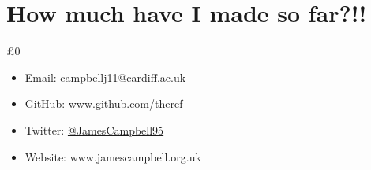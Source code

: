 \documentclass{beamer}
\begin{document}
\section{How much have I made so far?!!}

\begin{frame}{}
  \begin{center}
    {\fontsize{5cm}{5.5cm} \selectfont £0}
  \end{center}
\end{frame}

\begin{frame}[standout]
  \begin{itemize}
    \itemsep2em
    \item Email: \href{mailto:campbellj11@cardiff.ac.uk}{campbellj11@cardiff.ac.uk}

    \item GitHub: \href{https://github.com/theref}{www.github.com/theref}

    \item Twitter: \href{https://twitter.com/JamesCampbell95}{@JamesCampbell95}

    \item Website: www.jamescampbell.org.uk
  \end{itemize}
\end{frame}

\begin{frame}
  \printbibliography
\end{frame}
\end{document}
